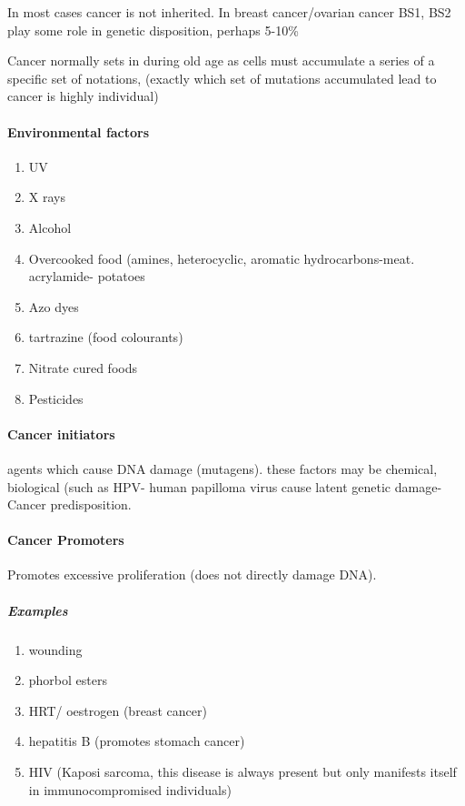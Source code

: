 \documentclass[]{article}
\providecommand{\tightlist}{%
  \setlength{\itemsep}{0pt}\setlength{\parskip}{0pt}}
\let\oldparagraph\paragraph
\renewcommand{\paragraph}[1]{\oldparagraph{#1}\mbox{}}
\let\oldsubparagraph\subparagraph
\renewcommand{\subparagraph}[1]{\oldsubparagraph{#1}\mbox{}}
\begin{document}
In most cases cancer is not inherited. In breast cancer/ovarian cancer
BS1, BS2 play some role in genetic disposition, perhaps 5-10\%

Cancer normally sets in during old age as cells must accumulate a series
of a specific set of notations, (exactly which set of mutations
accumulated lead to cancer is highly individual)

\hypertarget{environmental-factors}{%
\paragraph{Environmental factors}\label{environmental-factors}}

\begin{enumerate}
\def\labelenumi{\arabic{enumi}.}
\tightlist
\item
  UV
\item
  X rays
\item
  Alcohol
\item
  Overcooked food (amines, heterocyclic, aromatic hydrocarbons-meat.
  acrylamide- potatoes
\item
  Azo dyes
\item
  tartrazine (food colourants)
\item
  Nitrate cured foods
\item
  Pesticides
\end{enumerate}

\hypertarget{cancer-initiators}{%
\paragraph{Cancer initiators}\label{cancer-initiators}}

agents which cause DNA damage (mutagens). these factors may be chemical,
biological (such as HPV- human papilloma virus cause latent genetic
damage- Cancer predisposition.

\hypertarget{cancer-promoters}{%
\paragraph{Cancer Promoters}\label{cancer-promoters}}

Promotes excessive proliferation (does not directly damage DNA).

\hypertarget{examples}{%
\subparagraph{Examples}\label{examples}}

\begin{enumerate}
\def\labelenumi{\arabic{enumi}.}
\tightlist
\item
  wounding
\item
  phorbol esters
\item
  HRT/ oestrogen (breast cancer)
\item
  hepatitis B (promotes stomach cancer)
\item
  HIV (Kaposi sarcoma, this disease is always present but only manifests
  itself in immunocompromised individuals)
\end{enumerate}
\end{document}
